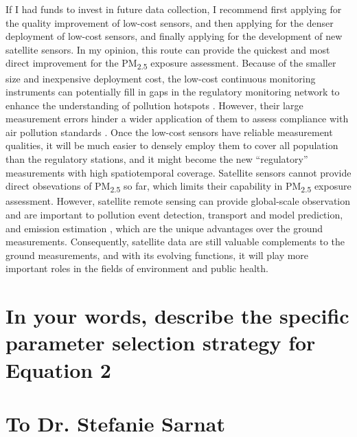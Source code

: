 \documentclass[11pt]{article}
\newcommand{\tsub}{\textsubscript}
\begin{document}
\begin{enumerate*}[{[a)]}]
    \item If I had funds to invest in future data collection, I recommend first applying for the quality improvement of low-cost sensors, and then applying for the denser deployment of low-cost sensors, and finally applying for the development of new satellite sensors. In my opinion, this route can provide the quickest and most direct improvement for the PM\tsub{2.5} exposure assessment. Because of the smaller size and inexpensive deployment cost, the low-cost continuous monitoring instruments can potentially fill in gaps in the regulatory monitoring network to enhance the understanding of pollution hotspots \citep{gao2015distributed}. However, their large measurement errors hinder a wider application of them to assess compliance with air pollution standards \citep{hall2014integrating}. Once the low-cost sensors have reliable measurement qualities, it will be much easier to densely employ them to cover all population than the regulatory stations, and it might become the new ``regulatory'' measurements with high spatiotemporal coverage. Satellite sensors cannot provide direct obsevations of PM\tsub{2.5} so far, which limits their capability in PM\tsub{2.5} exposure assessment. However, satellite remote sensing can provide global-scale observation and are important to pollution event detection, transport and model prediction, and emission estimation \citep{hoff2009remote}, which are the unique advantages over the ground measurements. Consequently, satellite data are still valuable complements to the ground measurements, and with its evolving functions, it will play more important roles in the fields of environment and public health. 
\end{enumerate*}

\section{In your words, describe the specific parameter selection strategy for Equation 2}

\section*{To Dr. Stefanie Sarnat}
\setcounter{section}{0}
\end{document}

